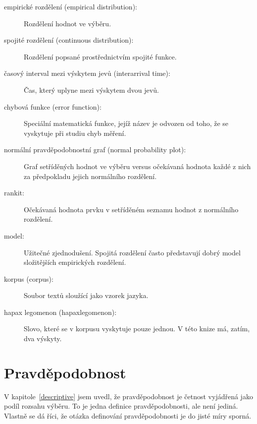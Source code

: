\documentclass[12pt]{book}
\begin{document}
\begin{description}

\item[empirické rozdělení (empirical distribution):] Rozdělení hodnot ve výběru.

\item[spojité rozdělení (continuous distribution):] Rozdělení popsané prostřednictvím spojité funkce.

\item[časový interval mezi výskytem jevů (interarrival time):] Čas, který uplyne mezi výskytem dvou jevů.

\item[chybová funkce (error function):] Speciální matematická funkce, jejíž název je odvozen od toho, že se vyskytuje při studiu chyb měření.

\item[normální pravděpodobnostní graf (normal probability plot):] Graf setříděných hodnot ve výběru versus očekávaná hodnota každé z nich za předpokladu jejich normálního rozdělení.

\item[rankit:] Očekávaná hodnota prvku v setříděném seznamu hodnot z normálního rozdělení.

\item[model:] Užitečné zjednodušení.  Spojitá rozdělení často představují dobrý model složitějších empirických rozdělení.

\item[korpus (corpus):] Soubor textů sloužící jako vzorek jazyka.

\item[hapax legomenon (hapaxlegomenon):] Slovo, které se v korpusu vyskytuje pouze jednou. V této knize má, zatím, dva výskyty.

\end{description}


\chapter{Pravděpodobnost}
\label{probability}

V kapitole~\ref{descriptive} jsem uvedl, že pravděpodobnost je četnost vyjádřená jako podíl rozsahu výběru.
To je jedna definice pravděpodobnosti, ale není jediná. Vlastně se dá říci, že otázka definování pravděpodobnosti je do jisté míry sporná.
\end{document}
